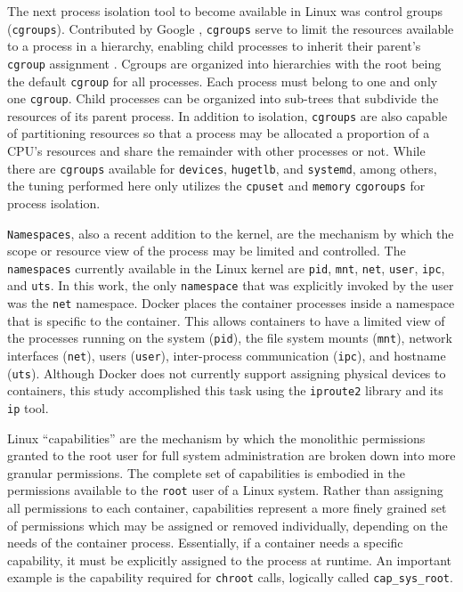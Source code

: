 The next process isolation tool to become available in Linux was control groups (\texttt{cgroups}).  
Contributed by Google \autocite{googlecgroups}, \texttt{cgroups} serve to limit the resources available to a process in a hierarchy, enabling child processes to inherit their parent's \texttt{cgroup} assignment \autocite{kernelcgroups}. 
Cgroups are organized into hierarchies with the root being the default \texttt{cgroup} for all processes. 
Each process must belong to one and only one \texttt{cgroup}. 
Child processes can be organized into sub-trees that subdivide the resources of its parent process.  
In addition to isolation, \texttt{cgroups} are also capable of partitioning resources so that a process may be allocated a proportion of a CPU's resources and share the remainder with other processes or not.
While there are \texttt{cgroups} available for \texttt{devices}, \texttt{hugetlb}, and \texttt{systemd}, among others, the tuning performed here only utilizes the \texttt{cpuset} and \texttt{memory} \texttt{cgoroups} for process isolation.

\texttt{Namespaces}, also a recent addition to the kernel, are the mechanism by which the scope or resource view of the process may be limited and controlled.
The \texttt{namespaces} currently available in the Linux kernel are \texttt{pid}, \texttt{mnt}, \texttt{net}, \texttt{user}, \texttt{ipc}, and \texttt{uts}.
In this work, the only \texttt{namespace} that was explicitly invoked by the user was the \texttt{net} namespace.  
Docker places the container processes inside a namespace that is specific to the container. 
This allows containers to have a limited view of the processes running on the system (\texttt{pid}), the file system mounts (\texttt{mnt}), network interfaces (\texttt{net}), users (\texttt{user}), inter-process communication (\texttt{ipc}), and hostname (\texttt{uts}).
Although Docker does not currently support assigning physical devices to containers, this study accomplished this task using the \texttt{iproute2} library and its \texttt{ip} tool.  

Linux ``capabilities'' are the mechanism by which the monolithic permissions granted to the root user for full system administration are broken down into more granular permissions.  
The complete set of capabilities is embodied in the permissions available to the \texttt{root} user of a Linux system.
Rather than assigning all permissions to each container, capabilities represent a more finely grained set of permissions which may be assigned or removed individually, depending on the needs of the container process.
Essentially, if a container needs a specific capability, it must be explicitly assigned to the process at runtime.
An important example is the capability required for \texttt{chroot} calls, logically called \texttt{cap\_sys\_root}.

